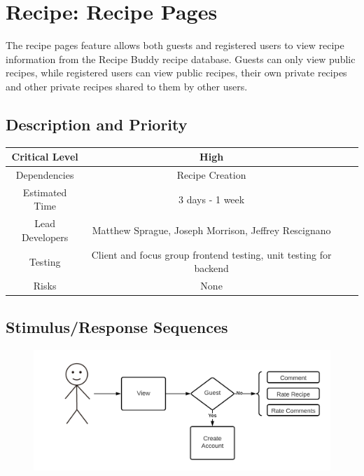 \documentclass{scrreprt}
\begin{document}
\section{Recipe: Recipe Pages}

The recipe pages feature allows both guests and registered users to view recipe information from the \gls{Recipe Buddy} recipe database. Guests can only view public recipes, while registered users can view public recipes, their own private recipes and other private recipes shared to them by other users.

\subsection{Description and Priority}
\begin{center}
    \begin{tabular}{| c | c | c | c |}
        \hline
        Critical Level  & High                                                                 \\
        \hline
        Dependencies    & Recipe Creation                                                      \\
        \hline
        Estimated Time  & 3 days - 1 week                                                      \\
        \hline
        Lead Developers & Matthew Sprague, Joseph Morrison, Jeffrey Rescignano \\
        \hline
        Testing         & Client and focus group \gls{frontend} testing,
                          \gls{unit testing} for \gls{backend}                                 \\
        \hline
        Risks           & None                                                                 \\
        \hline
    \end{tabular}
\end{center}

\subsection{Stimulus/Response Sequences}

\begin{figure}[H]\centering
    \includegraphics[width=\columnwidth]{FlowCharts/Recipe-Pages.png}
\end{figure}
\end{document}
